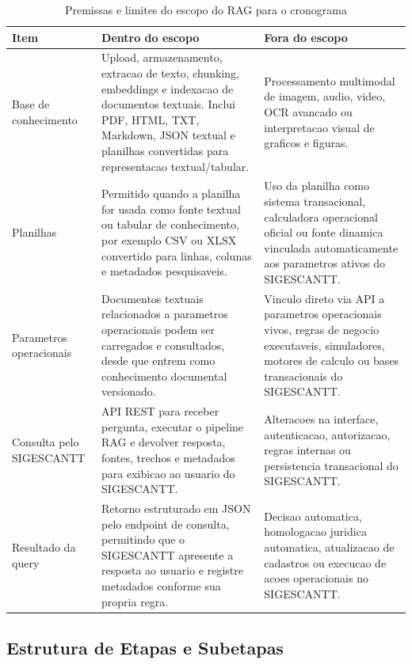 \documentclass[12pt, a4paper]{article}
\begin{document}
\begin{table}[H]
\centering
\footnotesize
\caption{Premissas e limites do escopo do RAG para o cronograma}
\label{tab:escopo_cronograma_rag}
\begin{tabularx}{\textwidth}{l X X}
\toprule
\textbf{Item} & \textbf{Dentro do escopo} & \textbf{Fora do escopo} \\
\midrule
Base de conhecimento & Upload, armazenamento, extracao de texto, chunking, embeddings e indexacao de documentos textuais. Inclui PDF, HTML, TXT, Markdown, JSON textual e planilhas convertidas para representacao textual/tabular. & Processamento multimodal de imagem, audio, video, OCR avancado ou interpretacao visual de graficos e figuras. \\
Planilhas & Permitido quando a planilha for usada como fonte textual ou tabular de conhecimento, por exemplo CSV ou XLSX convertido para linhas, colunas e metadados pesquisaveis. & Uso da planilha como sistema transacional, calculadora operacional oficial ou fonte dinamica vinculada automaticamente aos parametros ativos do SIGESCANTT. \\
Parametros operacionais & Documentos textuais relacionados a parametros operacionais podem ser carregados e consultados, desde que entrem como conhecimento documental versionado. & Vinculo direto via API a parametros operacionais vivos, regras de negocio executaveis, simuladores, motores de calculo ou bases transacionais do SIGESCANTT. \\
Consulta pelo SIGESCANTT & API REST para receber pergunta, executar o pipeline RAG e devolver resposta, fontes, trechos e metadados para exibicao ao usuario do SIGESCANTT. & Alteracoes na interface, autenticacao, autorizacao, regras internas ou persistencia transacional do SIGESCANTT. \\
Resultado da query & Retorno estruturado em JSON pelo endpoint de consulta, permitindo que o SIGESCANTT apresente a resposta ao usuario e registre metadados conforme sua propria regra. & Decisao automatica, homologacao juridica automatica, atualizacao de cadastros ou execucao de acoes operacionais no SIGESCANTT. \\
\bottomrule
\end{tabularx}
\end{table}

\subsection{Estrutura de Etapas e Subetapas}
\end{document}
